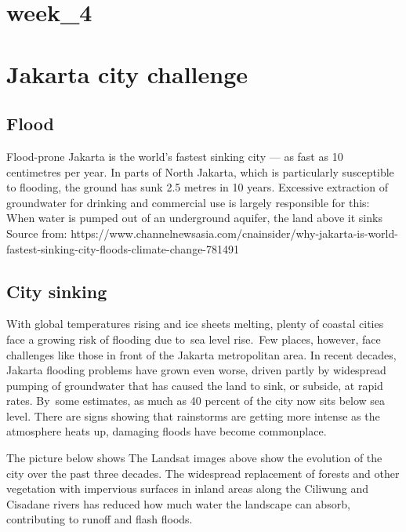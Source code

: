 \documentclass[
  letterpaper,
  DIV=11,
  numbers=noendperiod]{scrreprt}
\begin{document}

\chapter{week\_4}\label{week_4}


\chapter{Jakarta city challenge}\label{jakarta-city-challenge}

\section{Flood}\label{flood}

Flood-prone Jakarta is the world's fastest sinking city --- as fast as
10 centimetres per year. In parts of North Jakarta, which is
particularly susceptible to flooding, the ground has sunk 2.5 metres in
10 years. Excessive extraction of groundwater for drinking and
commercial use is largely responsible for this: When water is pumped out
of an underground aquifer, the land above it sinks Source from:
https://www.channelnewsasia.com/cnainsider/why-jakarta-is-world-fastest-sinking-city-floods-climate-change-781491

\section{City sinking}\label{city-sinking}

With global temperatures rising and ice sheets melting, plenty of
coastal cities face a growing risk of flooding due to~sea level
rise.~Few places, however, face challenges like those in front of the
Jakarta metropolitan area. In recent decades, Jakarta flooding problems
have grown even worse, driven partly by widespread pumping of
groundwater that has caused the land to sink, or subside, at rapid
rates. By~some estimates, as much as 40 percent of the city now sits
below sea level. There are signs showing that rainstorms are getting
more intense as the atmosphere heats up, damaging floods have become
commonplace.

The picture below shows The Landsat images above show the evolution of
the city over the past three decades. The widespread replacement of
forests and other vegetation with impervious surfaces in inland areas
along the Ciliwung and Cisadane rivers has reduced how much water the
landscape can absorb, contributing to runoff and flash floods.
\end{document}
